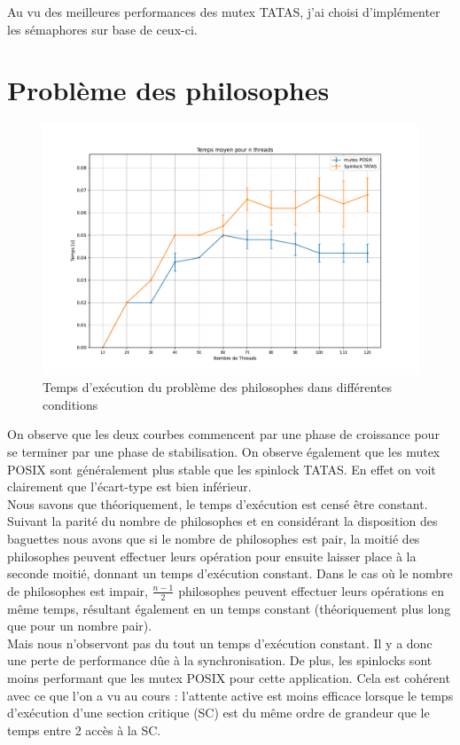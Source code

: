 \noindent Au vu des meilleures performances des mutex TATAS, j'ai choisi d'implémenter les sémaphores sur base de ceux-ci.
\section{Problème des philosophes}

\begin{figure}[h!]
    \centering
    \includegraphics[scale=0.4]{img/philosophes.pdf}
    \caption{Temps d'exécution du problème des philosophes dans différentes conditions}
    \label{pic:philo}
\end{figure}

\noindent On observe que les deux courbes commencent par une phase de croissance pour se terminer par une phase de stabilisation.
On observe également que les mutex POSIX sont généralement plus stable que les spinlock TATAS. En effet on voit clairement que l'écart-type est bien inférieur. \\

\noindent Nous savons que théoriquement, le temps d'exécution est censé être constant. Suivant la parité du nombre de philosophes et en considérant la disposition des baguettes nous avons que si le nombre de philosophes est pair, la moitié des philosophes peuvent effectuer leurs opération pour ensuite laisser place à la seconde moitié, donnant un temps d'exécution constant.
Dans le cas où le nombre de philosophes est impair, $\frac{n-1}{2}$ philosophes peuvent effectuer leurs opérations en même temps, résultant également en un temps constant (théoriquement plus long que pour un nombre pair). \\

\noindent Mais nous n'observont pas du tout un temps d'exécution constant. Il y a donc une perte de performance dûe à la synchronisation. 
De plus, les spinlocks sont moins performant que les mutex POSIX pour cette application. Cela est cohérent avec ce que l'on a vu au cours : l'attente active est moins efficace lorsque le temps d'exécution d'une section critique (SC) est du même ordre de grandeur que le temps entre 2 accès à la SC.

